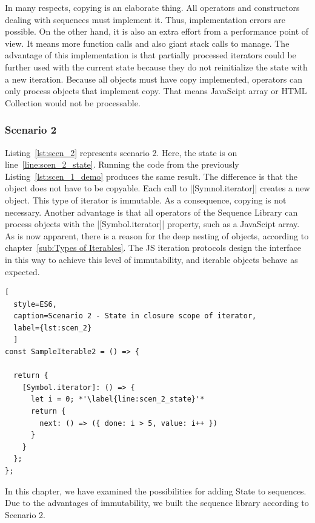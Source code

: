 In many respects, copying is an elaborate thing. All operators and constructors 
dealing with sequences must implement it. Thus, implementation errors are 
possible. On the other hand, it is also an extra effort from a performance point 
of view. It means more function calls and also giant stack calls to manage.
The advantage of this implementation is that partially processed iterators could 
be further used with the current state because they do not reinitialize the 
state with a new iteration.
Because all objects must have copy implemented, operators can 
only process objects that implement copy. That means JavaScipt array or HTML 
Collection would not be processable.

\subsubsection{Scenario 2}
Listing~\ref{lst:scen_2} represents scenario 2. Here, the state is on 
line~\ref{line:scen_2_state}. Running the code from the previously
Listing~\ref{lst:scen_1_demo} produces the same result. The difference is that 
the object does not have to be copyable. Each call to |[Symnol.iterator]| 
creates a new object. This type of iterator is immutable. As a consequence, 
copying is not necessary. Another advantage is that all operators of the 
Sequence Library can process objects with the |[Symbol.iterator]| property, 
such as a JavaScipt array.
\newline
As is now apparent, there is a reason for the deep nesting of objects, according 
to chapter~\ref{sub:Types of Iterables}. The JS iteration protocols design the 
interface in this way to achieve this level of immutability, and iterable 
objects behave as expected.

\begin{lstlisting}[
  style=ES6, 
  caption=Scenario 2 - State in closure scope of iterator,
  label={lst:scen_2}
  ]
const SampleIterable2 = () => {

  return {
    [Symbol.iterator]: () => {
      let i = 0; *'\label{line:scen_2_state}'*
      return {
        next: () => ({ done: i > 5, value: i++ })
      }
    }
  };
};
\end{lstlisting}

In this chapter, we have examined the possibilities for adding State to 
sequences. Due to the advantages of immutability, we built the sequence library 
according to Scenario 2.
